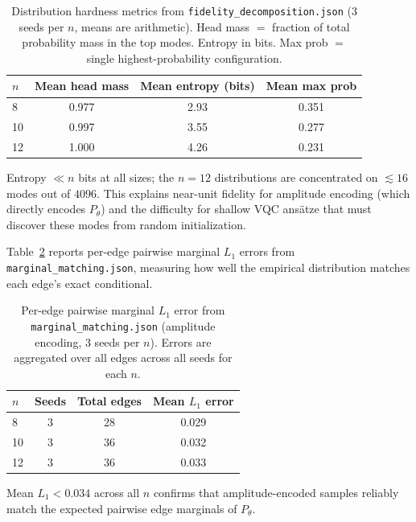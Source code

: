 \documentclass[conference,10pt]{IEEEtran}
\begin{document}
\begin{table}[t]
\centering
\caption{Distribution hardness metrics from \texttt{fidelity\_decomposition.json} (3 seeds per $n$, means are arithmetic). Head mass $=$ fraction of total probability mass in the top modes. Entropy in bits. Max prob $=$ single highest-probability configuration.}
\label{tab:fidelity_decomp}
\begin{tabular}{lccc}
\toprule
\textbf{$n$} & \textbf{Mean head mass} & \textbf{Mean entropy (bits)} & \textbf{Mean max prob} \\
\midrule
 8 & 0.977 & 2.93 & 0.351 \\
10 & 0.997 & 3.55 & 0.277 \\
12 & 1.000 & 4.26 & 0.231 \\
\bottomrule
\end{tabular}
\par\smallskip
{\footnotesize Entropy $\ll n$ bits at all sizes; the $n=12$ distributions are concentrated on $\lesssim16$ modes out of $4096$. This explains near-unit fidelity for amplitude encoding (which directly encodes $P_\theta$) and the difficulty for shallow VQC ans\"atze that must discover these modes from random initialization.}
\end{table}

Table~\ref{tab:marginals} reports per-edge pairwise marginal $L_1$ errors from \texttt{marginal\_matching.json}, measuring how well the empirical distribution matches each edge's exact conditional.

\begin{table}[t]
\centering
\caption{Per-edge pairwise marginal $L_1$ error from \texttt{marginal\_matching.json} (amplitude encoding, 3 seeds per $n$). Errors are aggregated over all edges across all seeds for each $n$.}
\label{tab:marginals}
\begin{tabular}{lccc}
\toprule
\textbf{$n$} & \textbf{Seeds} & \textbf{Total edges} & \textbf{Mean $L_1$ error} \\
\midrule
 8 & 3 & 28 & 0.029 \\
10 & 3 & 36 & 0.032 \\
12 & 3 & 36 & 0.033 \\
\bottomrule
\end{tabular}
\par\smallskip
{\footnotesize Mean $L_1<0.034$ across all $n$ confirms that amplitude-encoded samples reliably match the expected pairwise edge marginals of $P_\theta$.}
\end{table}
\end{document}
